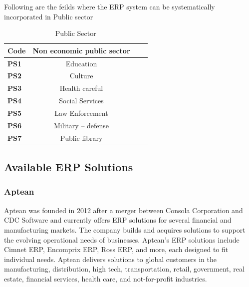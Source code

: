 Following are the feilds where the ERP system can be systematically incorporated in Public sector 

\begin{table}[H]
    \fontsize{10}{12}\selectfont
    \caption{Public Sector}
    \label{c1:tab1}
    \begin{center}
    \begin{tabular}{|p{3cm}|c|c|c|}
        \hline
        \textbf{Code }& \textbf {Non economic public sector} \\ \hline
        \textbf{PS1}    &   Education       \\\hline
        \textbf{PS2}    &   Culture         \\\hline
        \textbf{PS3}    &   Health careful  \\\hline
        \textbf{PS4}    &   Social Services \\\hline
        \textbf{PS5}    &   Law Enforcement \\\hline
        \textbf{PS6}    &   Military – defense\\\hline
        \textbf{PS7}    &   Public library   \\\hline
    \end{tabular}
    \end{center}
    \end{table}
    


\subsection{Available ERP Solutions}

\subsubsection*{Aptean}

Aptean was founded in 2012 after a merger between Consola Corporation and CDC Software and currently offers ERP solutions for several financial and manufacturing markets. The company builds and acquires solutions to support the evolving operational needs of businesses. Aptean’s ERP solutions include Cimnet ERP, Encomprix ERP, Ross ERP, and more, each designed to fit individual needs. Aptean delivers solutions to global customers in the manufacturing, distribution, high tech, transportation, retail, government, real estate, financial services, health care, and not-for-profit industries. \cite{Budget2019}


